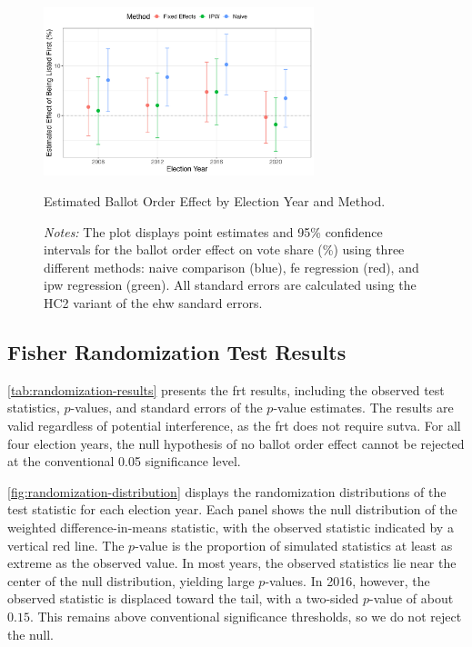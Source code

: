 \documentclass[10pt]{article}
\theoremstyle{sfstyle}
\theoremstyle{remark}
\begin{document}
\begin{figure}[htbp]
  \centering
  \includegraphics[width=0.7\textwidth]{../outputs/figures/effect_plot.png}
  \caption{Estimated Ballot Order Effect by Election Year and Method.}
  \caption*{\textit{Notes:} 
    The plot displays point estimates and 95\% confidence intervals 
    for the ballot order effect on vote share (\%)
    using three different methods: 
    naive comparison (blue), 
    \gls{fe} regression (red),
    and \gls{ipw} regression (green).
    All standard errors are calculated 
    using the HC2 variant of the \gls{ehw} sandard errors.}
  \label{fig:effect-plot}
\end{figure}

\subsection{Fisher Randomization Test Results}

\cref{tab:randomization-results} presents
the \gls{frt} results,
including the observed test statistics,
$p$-values,
and standard errors of the $p$-value estimates.
The results are valid regardless of potential interference,
as the \gls{frt} does not require \gls{sutva}.
For all four election years,
the null hypothesis of no ballot order effect
cannot be rejected at the conventional 0.05 significance level.




\cref{fig:randomization-distribution} displays the randomization distributions 
of the test statistic for each election year. 
Each panel shows the null distribution of the weighted difference-in-means statistic,
with the observed statistic indicated by a vertical red line.
The $p$-value is the proportion of simulated statistics 
at least as extreme as the observed value. 
In most years, the observed statistics lie near the center of the null distribution, 
yielding large $p$-values. 
In 2016, however, the observed statistic is displaced toward the tail, 
with a two-sided $p$-value of about $0.15$. 
This remains above conventional significance thresholds, 
so we do not reject the null.
\end{document}
